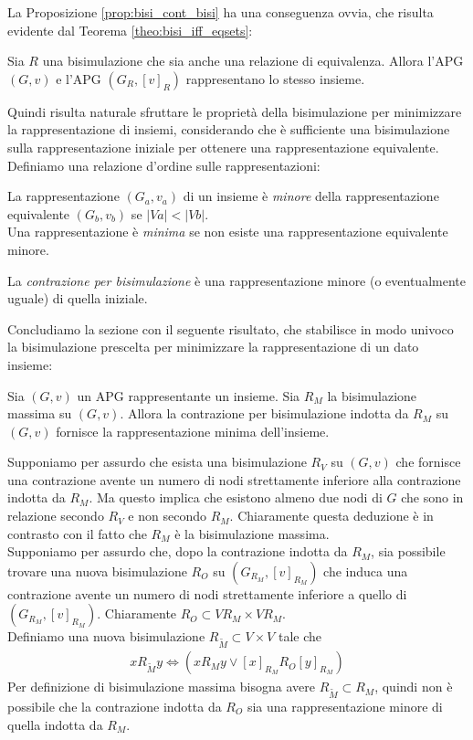 La Proposizione \ref{prop:bisi_cont_bisi} ha una conseguenza ovvia, che risulta evidente dal Teorema \ref{theo:bisi_iff_eqsets}:
\begin{corollary}
    Sia $R$ una bisimulazione che sia anche una relazione di equivalenza. Allora l'APG $(G, v)$ e l'APG $(G_R, [v]_R)$ rappresentano lo stesso insieme.
\end{corollary}
Quindi risulta naturale sfruttare le proprietà della bisimulazione per minimizzare la rappresentazione di insiemi, considerando che è sufficiente una bisimulazione sulla rappresentazione iniziale per ottenere una rappresentazione equivalente. Definiamo una relazione d'ordine sulle rappresentazioni:
\begin{definition}
    La rappresentazione $(G_a, v_a)$ di un insieme è \emph{minore} della rappresentazione equivalente $(G_b, v_b)$ se $|Va| < |Vb|$.\\
    Una rappresentazione è \emph{minima} se non esiste una rappresentazione equivalente minore.
\end{definition}
\begin{observation}
    La \emph{contrazione per bisimulazione} è una rappresentazione minore (o eventualmente uguale) di quella iniziale.
\end{observation}
Concludiamo la sezione con il seguente risultato, che stabilisce in modo univoco la bisimulazione prescelta per minimizzare la rappresentazione di un dato insieme:
\begin{theorem}
    Sia $(G,v)$ un APG rappresentante un insieme. Sia $R_M$ la bisimulazione massima su $(G,v)$. Allora la contrazione per bisimulazione indotta da $R_M$ su $(G,v)$ fornisce la rappresentazione minima dell'insieme.
\end{theorem}
\begin{proof2}
    Supponiamo per assurdo che esista una bisimulazione $R_V$ su $(G,v)$ che fornisce una contrazione avente un numero di nodi strettamente inferiore alla contrazione indotta da $R_M$. Ma questo implica che esistono almeno due nodi di $G$ che sono in relazione secondo $R_V$ e non secondo $R_M$. Chiaramente questa deduzione è in contrasto con il fatto che $R_M$ è la bisimulazione massima.\\
    Supponiamo per assurdo che, dopo la contrazione indotta da $R_M$, sia possibile trovare una nuova bisimulazione $R_O$ su $(G_{R_M}, [v]_{R_M})$ che induca una contrazione avente un numero di nodi strettamente inferiore a quello di $(G_{R_M}, [v]_{R_M})$. Chiaramente $R_O \subset V{R_M} \times V{R_M}$.\\
    Definiamo una nuova bisimulazione $R_{\widetilde{M}} \subset V\times V$ tale che
    \begin{gather*}
        x R_{\widetilde{M}} y \iff (x R_M y \lor [x]_{R_M} R_O [y]_{R_M})
    \end{gather*}
    Per definizione di bisimulazione massima bisogna avere $R_{\widetilde{M}} \subset R_M$, quindi non è possibile che la contrazione indotta da $R_O$ sia una rappresentazione minore di quella indotta da $R_M$.
\end{proof2}
